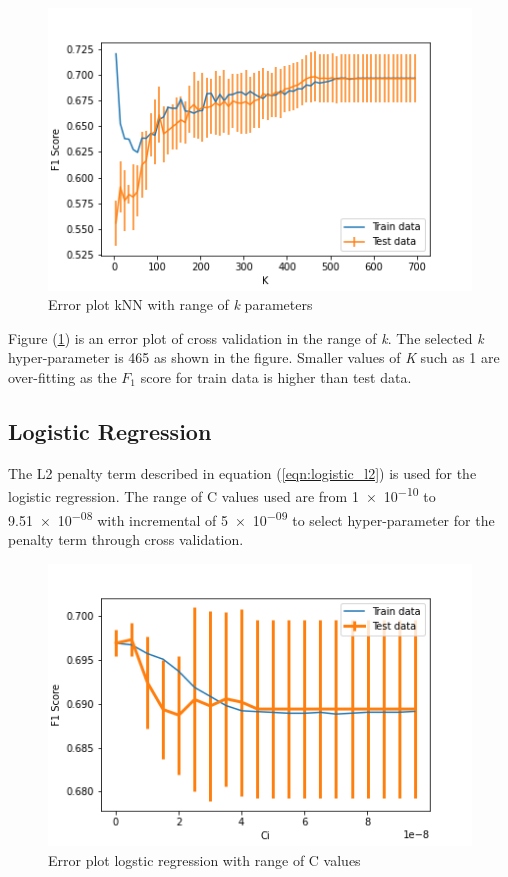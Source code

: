 \documentclass[transmag]{IEEEtran}
\begin{document}
\begin{figure}[h]
	\includegraphics[width=\columnwidth]{knn_cv_k.png} 
    \caption{Error plot kNN with range of \emph{k} parameters}%
    \label{fig:knn_k}%
\end{figure}
\noindent Figure (\ref{fig:knn_k}) is an error plot of cross validation in the range of \emph{k}. The selected \emph{k} hyper-parameter is 465 as shown in the figure. Smaller values of \emph{K} such as 1 are over-fitting as the $F_1$ score  for train data is higher than test data.

\subsection{Logistic Regression}
\noindent The L2 penalty term described in equation (\ref{eqn:logistic_l2}) is used for the logistic regression. The range of C values used are from \num{1e-10} to \num{9.51e-08} with incremental of \num{5e-09} to select hyper-parameter for the penalty term through cross validation.

\begin{figure}[h]
	\includegraphics[width=\columnwidth]{logistic_cv_ci.png} 
    \caption{Error plot logstic regression with range of C values}%
    \label{fig:logistic_c}%
\end{figure}
\end{document}
